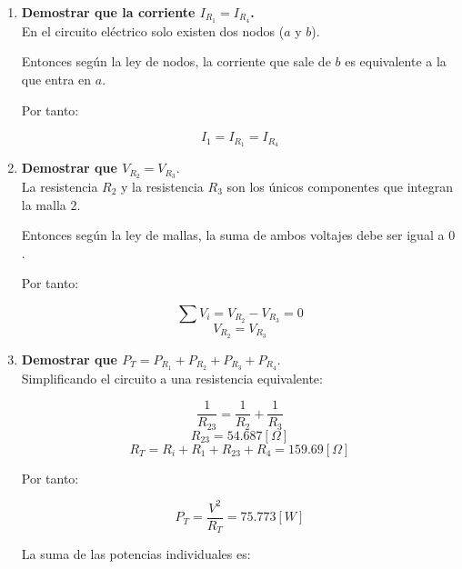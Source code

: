\documentclass[letter,11pt]{article}
\begin{document}
\begin{enumerate}
\item \textbf{Demostrar que la corriente $I_{R_1} = I_{R_4}$.} \\
En el circuito eléctrico solo existen dos nodos ($a$ y $b$).

Entonces según la ley de nodos, la corriente que sale de $b$ es equivalente a la
que entra en $a$.

Por tanto:

\begin{equation*}
    I_1 = I_{R_1} = I_{R_4}
\end{equation*}

\item \textbf{Demostrar que $V_{R_2} = V_{R_3}$}. \\
La resistencia $R_2$ y la resistencia $R_3$ son los únicos componentes que
integran la malla $2$.

Entonces según la ley de mallas, la suma de ambos voltajes debe ser igual a $0$.

Por tanto:

\begin{equation*}
    \sum V_i = V_{R_2} - V_{R_3} = 0
\end{equation*}
\begin{equation*}
    V_{R_2} = V_{R_3}
\end{equation*}

\item \textbf{Demostrar que $P_T = P_{R_1} + P_{R_2} + P_{R_3} + P_{R_4}$}. \\

Simplificando el circuito a una resistencia equivalente:

\begin{equation*}
    \frac{1}{R_{23}} = \frac{1}{R_2} + \frac{1}{R_3}
\end{equation*}
\begin{equation*}
    R_{23} = 54.687 [\Omega]
\end{equation*}
\begin{equation*}
    R_T = R_i + R_1 + R_{23} + R_4 = 159.69 [\Omega]
\end{equation*}

Por tanto:

\begin{equation*}
    P_T = \frac{V^2}{R_T} = 75.773 [W]
\end{equation*}

La suma de las potencias individuales es:


\end{enumerate}
\end{document}
